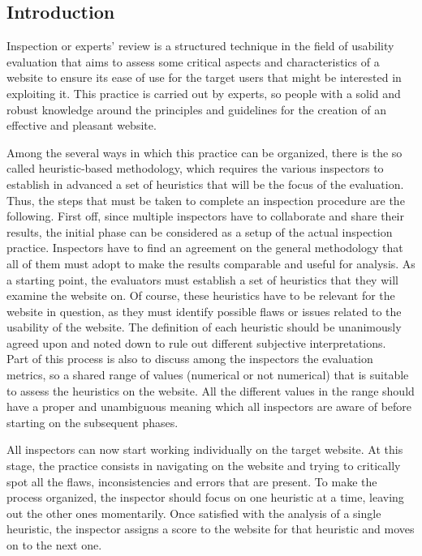 \subsection{Introduction}

Inspection or experts' review is a structured technique in the field of usability evaluation that aims to assess some critical aspects and characteristics of a website to ensure its ease of use for the target users that might be interested in exploiting it.
This practice is carried out by experts, so people with a solid and robust knowledge around the principles and guidelines for the creation of an effective and pleasant website.

Among the several ways in which this practice can be organized, there is the so called heuristic-based methodology, which requires the various inspectors to establish in advanced a set of heuristics that will be the focus of the evaluation.\\
Thus, the steps that must be taken to complete an inspection procedure are the following. 
First off, since multiple inspectors have to collaborate and share their results, the initial phase can be considered as a setup of the actual inspection practice. Inspectors have to find an agreement on the general methodology that all of them must adopt to make the results comparable and useful for analysis. As a starting point, the evaluators must establish a set of heuristics that they will examine the website on. Of course, these heuristics have to be relevant for the website in question, as they must identify possible flaws or issues related to the usability of the website. The definition of each heuristic should be unanimously agreed upon and noted down to rule out different subjective interpretations.\\
Part of this process is also to discuss among the inspectors the evaluation metrics, so a shared range of values (numerical or not numerical) that is suitable to assess the heuristics on the website. All the different values in the range should have a proper and unambiguous meaning which all inspectors are aware of before starting on the subsequent phases.

All inspectors can now start working individually on the target website. At this stage, the practice consists in navigating on the website and trying to critically spot all the flaws, inconsistencies and errors that are present. To make the process organized, the inspector should focus on one heuristic at a time, leaving out the other ones momentarily. Once satisfied with the analysis of a single heuristic, the inspector assigns a score to the website for that heuristic and moves on to the next one.

